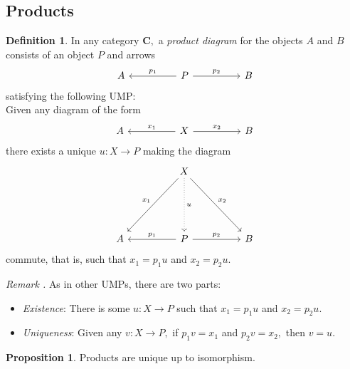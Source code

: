 \documentclass[11pt,leqno,landscape,semhelv]{seminar}
\numberwithin{equation}{section}
\theoremstyle{definition}
\newtheorem{prop}[thm]{Proposition}
\newtheorem{defn}[thm]{Definition}
\numberwithin{thm}{section}
\numberwithin{equation}{section}
\newcommand{\remark}[1]{\refstepcounter{thm}\par\medskip
   {\textit{Remark \thethm.} #1} \rmfamily}
\begin{document}
\subsection{Products}
\begin{defn} 
	In any category $\mathbf{C},$ a \emph{product diagram} for the objects $A$ and $B$ consists of an object $P$ and arrows
	\begin{equation*} 
		\begin{tikzcd}
			A && P \arrow[ll, "p_1"'] \arrow[rr, "p_2"] && B
		\end{tikzcd}
	\end{equation*}
	satisfying the following UMP:\\
	Given any diagram of the form
	\begin{equation*} 
		\begin{tikzcd}
			A && X \arrow[ll, "x_1"'] \arrow[rr, "x_2"] && B
		\end{tikzcd}
	\end{equation*}
	there exists a unique $u:X\to P$ making the diagram
	\begin{equation*} 
		\begin{tikzcd}
			&& X \arrow[llddd, "x_1"'] \arrow[rrddd, "x_2"] \arrow[ddd, dotted, "u"] &&\\
			&&&&\\&&&&\\
			A && P \arrow[ll, "p_1"'] \arrow[rr, "p_2"] && B
		\end{tikzcd}
	\end{equation*}
	commute, that is, such that $x_1 = p_1u$ and $x_2 = p_2u.$
\end{defn}
\remark{} As in other UMPs, there are two parts:
\begin{itemize}
	\item \emph{Existence}: There is some $u:X\to P$ such that $x_1 = p_1u$ and $x_2 = p_2u.$
	\item \emph{Uniqueness}: Given any $v:X\to P,$ if $p_1v = x_1$ and $p_2v = x_2,$ then $v = u.$ 
\end{itemize}
\begin{prop}
	Products are unique up to isomorphism.
\end{prop}
\end{document}
